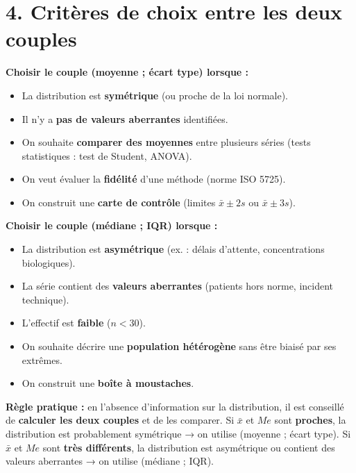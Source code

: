 \documentclass[11pt,a4paper]{article}
\begin{document}
\vspace{0.3cm}

\section*{4. Critères de choix entre les deux couples}

\begin{choix}
\textbf{Choisir le couple (moyenne ; écart type) lorsque :}
\begin{itemize}[leftmargin=*]
  \item La distribution est \textbf{symétrique} (ou proche de la loi normale).
  \item Il n'y a \textbf{pas de valeurs aberrantes} identifiées.
  \item On souhaite \textbf{comparer des moyennes} entre plusieurs séries (tests statistiques : test de Student, ANOVA).
  \item On veut évaluer la \textbf{fidélité} d'une méthode (norme ISO 5725).
  \item On construit une \textbf{carte de contrôle} (limites $\bar{x} \pm 2s$ ou $\bar{x} \pm 3s$).
\end{itemize}

\vspace{0.3cm}
\textbf{Choisir le couple (médiane ; IQR) lorsque :}
\begin{itemize}[leftmargin=*]
  \item La distribution est \textbf{asymétrique} (ex. : délais d'attente, concentrations biologiques).
  \item La série contient des \textbf{valeurs aberrantes} (patients hors norme, incident technique).
  \item L'effectif est \textbf{faible} ($n < 30$).
  \item On souhaite décrire une \textbf{population hétérogène} sans être biaisé par ses extrêmes.
  \item On construit une \textbf{boîte à moustaches}.
\end{itemize}

\vspace{0.3cm}
\textbf{Règle pratique :} en l'absence d'information sur la distribution, il est conseillé de \textbf{calculer les deux couples} et de les comparer. Si $\bar{x}$ et $Me$ sont \textbf{proches}, la distribution est probablement symétrique → on utilise (moyenne ; écart type). Si $\bar{x}$ et $Me$ sont \textbf{très différents}, la distribution est asymétrique ou contient des valeurs aberrantes → on utilise (médiane ; IQR).
\end{choix}
\end{document}
